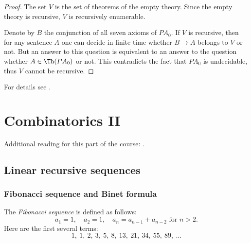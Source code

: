 \begin{page}
\setcounter{section}{0}
\setcounter{subsection}{0}
\setcounter{dfn}{37}
\label{portion:691}

\begin{proof}
The set $V$ is the set of theorems of the empty theory. Since the empty theory is recursive, $V$ is recursively enumerable.

Denote by $B$ the conjunction of all seven axioms of $PA_0$.
If $V$ is recursive, then for any sentence $A$ one can decide in finite time whether $B \to A$ belongs to $V$ or not.
But an answer to this question is equivalent to an answer to the question whether $A \in \Th(PA_0)$ or not.
This contradicts the fact that $PA_0$ is undecidable, thus $V$ cannot be recursive.
\end{proof}




For details see \cite{CL1,CL2}.





\end{page}

\begin{page}
\setcounter{section}{1}
\setcounter{subsection}{0}
\setcounter{dfn}{37}
\label{portion:692}

\chapter{Combinatorics II}
Additional reading for this part of the course: \cite{Aig07}.


\end{page}

\begin{page}
\setcounter{section}{1}
\setcounter{subsection}{1}
\setcounter{dfn}{0}
\label{portion:693}

\section{Linear recursive sequences}

\end{page}

\begin{page}
\setcounter{section}{1}
\setcounter{subsection}{1}
\setcounter{dfn}{0}
\label{portion:694}

\subsection{Fibonacci sequence and Binet formula}
The \emph{Fibonacci sequence} is defined as follows:
\[
a_1 = 1, \quad a_2 = 1, \quad a_n = a_{n-1} + a_{n-2} \text{ for }n > 2.
\]
Here are the first several terms:
\[
1,\ 1,\ 2,\ 3,\ 5,\ 8,\ 13,\ 21,\ 34,\ 55,\ 89,\ \ldots
\]


\end{page}

